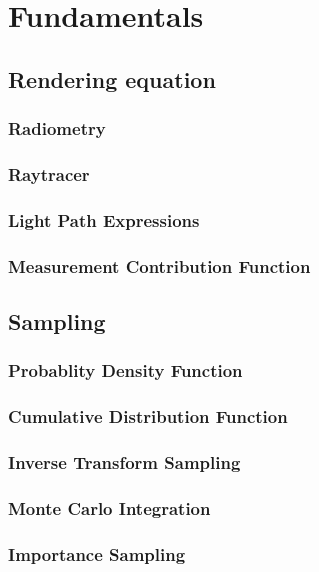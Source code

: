 \chapter{Fundamentals}
\label{ch:Fundamentals}


\section{Rendering equation}
\subsection{Radiometry}
\subsection{Raytracer}
\subsection{Light Path Expressions}
\subsection{Measurement Contribution Function}


\section{Sampling}

\subsection{Probablity Density Function}

\subsection{Cumulative Distribution Function}

\subsection{Inverse Transform Sampling}

\subsection{Monte Carlo Integration}
\label{sec:MC}

\subsection{Importance Sampling}
\label{sec:IS}


